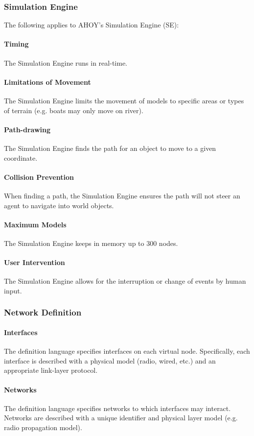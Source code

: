 \documentclass[titlepage]{article}
\begin{document}
\subsubsection{Simulation Engine}
	The following applies to AHOY's Simulation Engine (SE):
    \paragraph{Timing} The Simulation Engine runs in real-time.
    \paragraph{Limitations of Movement} The Simulation Engine limits the movement of models to specific areas or types of terrain (e.g. boats may only move on river).
    \paragraph{Path-drawing} The Simulation Engine finds the path for an object to move to a given coordinate.
    \paragraph{Collision Prevention} When finding a path, the Simulation Engine ensures the path will not steer an agent to navigate into world objects.
    \paragraph{Maximum Models} The Simulation Engine keeps in memory up to 300 nodes.
    \paragraph{User Intervention} The Simulation Engine allows for the interruption or change of events by human input.

\subsubsection{Network Definition}
	\paragraph{Interfaces} The definition language specifies interfaces on each virtual node.  Specifically, each interface is described with a physical model (radio, wired, etc.) and an appropriate link-layer protocol.
	\paragraph{Networks} The definition language specifies networks to which interfaces may interact.  Networks are described with a unique identifier and physical layer model (e.g. radio propagation model).
\end{document}
